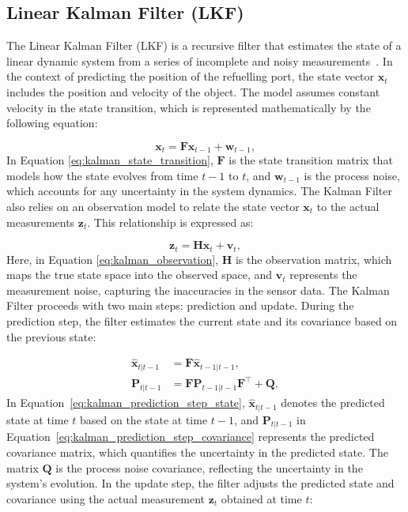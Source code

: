 \documentclass[12pt,oneside]{book} %
\begin{document}
\subsection*{Linear Kalman Filter (LKF)}
\noindent The Linear Kalman Filter (LKF) is a recursive filter that estimates the state of a linear dynamic system from a series of incomplete and noisy measurements~\cite{kalman1960new}. In the context of predicting the position of the refuelling port, the state vector $\mathbf{x}_t$ includes the position and velocity of the object. The model assumes constant velocity in the state transition, which is represented mathematically by the following equation:

\begin{equation}
    \mathbf{x}_t = \mathbf{F} \mathbf{x}_{t-1} + \mathbf{w}_{t-1}, \label{eq:kalman_state_transition}
\end{equation}
In Equation \eqref{eq:kalman_state_transition}, $\mathbf{F}$ is the state transition matrix that models how the state evolves from time $t-1$ to $t$, and $\mathbf{w}_{t-1}$ is the process noise, which accounts for any uncertainty in the system dynamics. The Kalman Filter also relies on an observation model to relate the state
vector $\mathbf{x}_t$ to the actual measurements $\mathbf{z}_t$. This
relationship is expressed as:

\begin{equation}
    \mathbf{z}_t = \mathbf{H} \mathbf{x}_t + \mathbf{v}_t, \label{eq:kalman_observation}
\end{equation}
Here, in Equation \eqref{eq:kalman_observation}, $\mathbf{H}$ is the observation matrix, which maps the true state space into the observed space, and $\mathbf{v}_t$ represents the measurement noise, capturing the inaccuracies in the sensor data.
The Kalman Filter proceeds with two main steps: prediction and update. During
the prediction step, the filter estimates the current state and its covariance
based on the previous state:

\begin{align}
    \hat{\mathbf{x}}_{t|t-1} & = \mathbf{F} \hat{\mathbf{x}}_{t-1|t-1}, \label{eq:kalman_prediction_step_state}                             \\
    \mathbf{P}_{t|t-1}       & = \mathbf{F} \mathbf{P}_{t-1|t-1} \mathbf{F}^\top + \mathbf{Q}, \label{eq:kalman_prediction_step_covariance}
\end{align}
In Equation~\eqref{eq:kalman_prediction_step_state}, $\hat{\mathbf{x}}_{t|t-1}$ denotes the predicted state at time $t$ based on the state at time $t-1$, and $\mathbf{P}_{t|t-1}$ in Equation~\eqref{eq:kalman_prediction_step_covariance} represents the predicted covariance matrix, which quantifies the uncertainty in the predicted state. The matrix $\mathbf{Q}$ is the process noise covariance, reflecting the uncertainty in the system's evolution.
In the update step, the filter adjusts the predicted state and covariance using
the actual measurement $\mathbf{z}_t$ obtained at time $t$:
\end{document}
